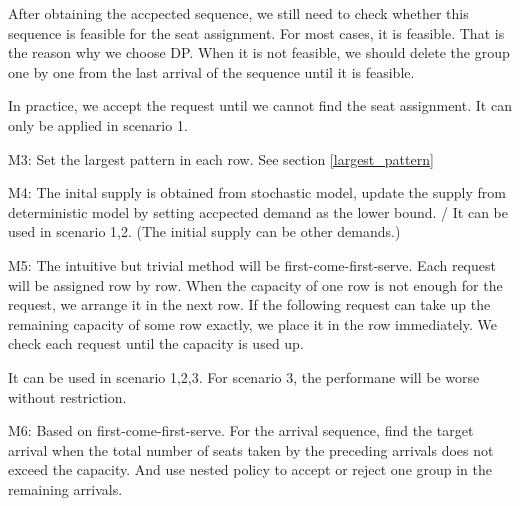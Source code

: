 After obtaining the accpected sequence, we still need to check whether this sequence is feasible for the seat assignment. For most cases, it is feasible. That is the reason why we choose DP. When it is not feasible, we should delete the group one by one from the last arrival of the sequence until it is feasible.

In practice, we accept the request until we cannot find the seat assignment. It can only be applied in scenario 1.






M3: Set the largest pattern in each row. See section \ref{largest_pattern}

M4: 
The inital supply is obtained from stochastic model, update the supply from deterministic model by setting accpected demand as the lower bound. / It can be used in scenario 1,2. (The initial supply can be other demands.)


M5:
The intuitive but trivial method will be first-come-first-serve. Each request will be assigned row by row. When the capacity of one row is not enough for the request, we arrange it in the next row. If the following request can take up the remaining capacity of some row exactly, we place it in the row immediately. We check each request until the capacity is used up. 

It can be used in scenario 1,2,3. For scenario 3, the performane will be worse without restriction.



M6: Based on first-come-first-serve. For the arrival sequence, find the target arrival when the total number of seats taken by the preceding arrivals does not exceed the capacity. And use nested policy to accept or reject one group in the remaining arrivals.


